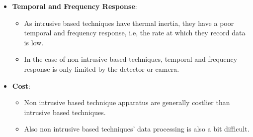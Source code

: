 \documentclass{article}
\begin{document}
\begin{itemize}
	\item \textbf{Temporal and Frequency Response}:
	\begin{itemize}
		\item As intrusive based techniques have thermal inertia, they have a poor temporal and frequency response, i.e, the rate at which they record data is low.
		\item In the case of non intrusive based techniques, temporal and frequency response is only limited by the detector or camera.
	\end{itemize}

	\item \textbf{Cost}:
	\begin{itemize}
		\item Non intrusive based technique apparatus are generally costlier than intrusive based techniques.
		\item Also non intrusive based techniques' data processing is also a bit difficult.
	\end{itemize}

\end{itemize}
\end{document}
